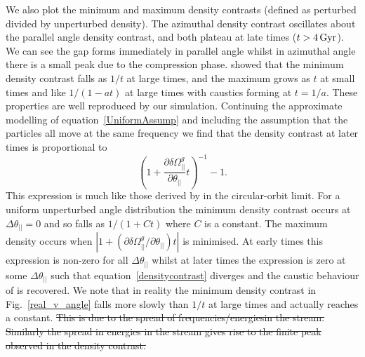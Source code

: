 \documentclass[useAMS,usenatbib,fleqn,a4paper]{mn2e}
\def\Gyr{\,{\rm Gyr}}
\providecommand{\DIFdeltex}[1]{{\protect\color{red}\sout{#1}}}                      %
\providecommand{\DIFdelbegin}{} %
\providecommand{\DIFdelend}{} %
\providecommand{\DIFdel}[1]{\texorpdfstring{\DIFdeltex{#1}}{}} %
\begin{document}
We also plot the minimum and maximum density contrasts (defined as perturbed divided by unperturbed density). The azimuthal density contrast oscillates about the parallel angle density contrast, and both plateau at late times ($t>4\Gyr$). We can see the gap forms immediately in parallel angle whilst in azimuthal angle there is a small peak due to the compression phase. \cite{ErkalBelokurov2015} showed that the minimum density contrast falls as $1/t$ at large times, and the maximum grows as $t$ at small times and like $1/(1-at)$ at large times with caustics forming at $t=1/a$. These properties are well reproduced by our simulation. Continuing the approximate modelling of equation~\eqref{UniformAssump} and including the assumption that the particles all move at the same frequency we find that the density contrast at later times is proportional to
\begin{equation}
(1+\frac{\partial\delta\Omega^g_{||}}{\partial\theta_{||}}t)^{-1}-1.
\label{densitycontrast}
\end{equation}
This expression is much like those derived by \cite{ErkalBelokurov2015} in the circular-orbit limit. For a uniform unperturbed angle distribution the minimum density contrast occurs at $\Delta\theta_{||}=0$ and so falls as $1/(1+Ct)$ where $C$ is a constant. The maximum density occurs when $|1+(\partial\delta\Omega^g_{||}/\partial\theta_{||})t|$ is minimised. At early times this expression is non-zero for all $\Delta\theta_{||}$ whilst at later times the expression is zero at some $\Delta\theta_{||}$ such that equation~\eqref{densitycontrast} diverges and the caustic behaviour of \cite{ErkalBelokurov2015} is recovered. We note that in reality the minimum density contrast in Fig.~\ref{real_v_angle} falls more slowly than $1/t$ at large times and actually reaches a constant.
\DIFdelbegin \DIFdel{This is due to the spread of frequencies/energiesin the stream. Similarly the spread in energies in the stream gives rise to the finite peak observed in the density contrast.
}\DIFdelend 
\end{document}
